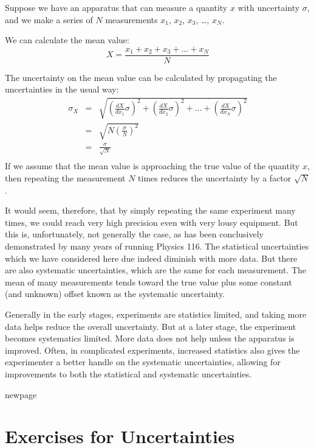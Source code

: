 \documentclass[12pt]{article}
\begin{document}
Suppose we have an apparatus that can measure a quantity $x$ with uncertainty $\sigma$, and we make a series of $N$ measurements $x_1$, $x_2$, $x_3$, \ldots, $x_N$.

We can calculate the mean value:
\begin{displaymath}
X = \frac{x_1 + x_2 + x_3 + \ldots + x_N}{N}
\end{displaymath}

The uncertainty on the mean value can be calculated by propagating the uncertainties in the usual way:
\begin{eqnarray*}
\sigma_X &=& \sqrt{\left(\frac{dX}{dx_1} \sigma \right)^2 
+ \left(\frac{dX}{dx_2} \sigma \right)^2 +  \ldots + \left(\frac{dX}{dx_N} \sigma \right)^2 } \\
&=& \sqrt{N \left(\frac{\sigma}{N} \right)^2}\\ 
&=& \frac{\sigma}{\sqrt{N}} \\
\end{eqnarray*}
If we assume that the mean value is approaching the true value of the quantity $x$, then repeating the measurement $N$ times reduces the uncertainty by a factor $\sqrt{N}$.

It would seem, therefore, that by simply repeating the same experiment many times, we could reach very high precision even with very lousy equipment.  But this is, unfortunately, not generally the case, as has been conclusively demonstrated by many years of running Physics 116.  The statistical uncertainties which we have considered here due indeed diminish with more data.  But there are also systematic uncertainties, which are the same for each measurement.  The mean of many measurements tends toward the true value plus some constant (and unknown) offset known as the systematic uncertainty.  

Generally in the early stages, experiments are statistics limited, and taking more data helps reduce the overall uncertainty.  But at a later stage, the experiment becomes systematics limited.  More data does not help unless the apparatus is improved.  Often, in complicated experiments, increased statistics also gives the experimenter a better handle on the systematic uncertainties, allowing for improvements to both the statistical and systematic uncertainties.

newpage
\section{Exercises for Uncertainties}
\end{document}
